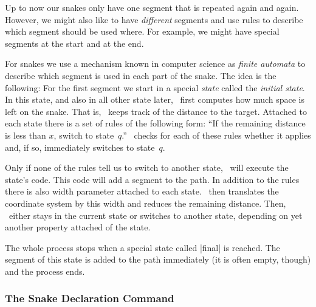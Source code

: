 Up to now our snakes only have one segment that is repeated again and
again. However, we might also like to have \emph{different} segments
and use rules to describe which segment should be used where. For
example, we might have special segments at the start and at the end.

For snakes we use a mechanism known in computer science as
\emph{finite automata} to describe which segment is used in each part
of the snake. The idea is the following: For the first segment we
start in a special \emph{state} called the \emph{initial state}. In
this state, and also in all other state later, \pgfname\ first
computes how much space is left on the snake. That is, \pgfname\ keeps
track of the distance to the target. Attached to each state there is a
set of rules of the following form: ``If the remaining distance is
less than $x$, switch to state~$q$.'' \pgfname\ checks for each of
these rules whether it applies and, if so, immediately switches to
state~$q$.

Only if none of the rules tell us to switch to another
state, \pgfname\ will execute the state's code. This code will add a
segment to the path. In addition to the rules there is also width
parameter attached to each state. \pgfname\ then translates the
coordinate system by this width and reduces the remaining distance.
Then, \pgfname\ either stays in the current state or switches to
another state, depending on yet another property attached of the
state.

The whole process stops when a special state called |final| is
reached. The segment of this state is added to the path immediately
(it is often empty, though) and the process ends.

\subsubsection{The Snake Declaration Command}

